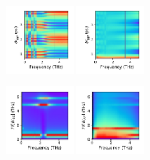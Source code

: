 \documentclass[a4paper]{article}
\begin{document}
\begin{figure}[H]
  \centering
  \includegraphics[width=0.23\textwidth]{cond_pcolor-A1-v1-imp0.pdf}
  \includegraphics[width=0.23\textwidth]{cond_pcolor-A1-v1-imp3.pdf}
\end{figure}
\begin{figure}[H]
  \centering
  \includegraphics[width=0.23\textwidth]{cond_w_pcolor-A1-v1-imp0.pdf}
  \includegraphics[width=0.23\textwidth]{cond_w_pcolor-A1-v1-imp3.pdf}
\end{figure}
\end{document}
